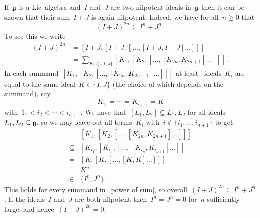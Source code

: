 \begin{remark}
  If~$\mathfrak{g}$ is a Lie~algebra and~$I$ and~$J$ are two nilpotent ideals in~$\mathfrak{g}$ then it can be shown that their sum~$I+J$ is again nilpotent.
  Indeed, we have for all~$n \geq 0$ that
  \[
    (I + J)^{2n}
    \subseteq
    I^n + J^n \,.
  \]
  To see this we write
  \begin{equation}
    \label{power of sum}
    \begin{aligned}
      (I + J)^{2n}
      &=
      [I+J, [I+J, [\dotsc, [I+J, I+J] \dotsc] ] ]
      \\
      &=
      \sum_{K_i \in \{I, J\}}
      [K_1, [K_2, [\dotsc, [K_{2n}, K_{2n+1}] \dotsc] ] ] \,.
    \end{aligned}
  \end{equation}
  In each summand~$[K_1, [K_2, [\dotsc, [K_{2n}, K_{2n+1}] \dotsc] ] ]$ at least~{} ideals~$K_i$ are equal to the same ideal~$K \in \{I, J\}$ (the choice of which depends on the summand), say
  \[
    K_{i_1}
    =
    \dotsb
    =
    K_{i_{n+1}}
    =
    K
  \]
  with~$1_1 < i_2 < \dotsb < i_{n+1}$.
  We have that~$[L_1, L_2] \subseteq L_1, L_2$ for all ideals~$L_1, L_2 \subseteq \mathfrak{g}$, so we may leave out all terms~$K_i$ with~$i \notin \{i_1, \dotsc, i_{n+1}\}$ to get
  \begin{align*}
    {}&
    [K_1, [K_2, [\dotsc, [K_{2n}, K_{2n+1}] \dotsc] ] ]
    \\
    \subseteq{}&
    [K_{i_1}, [K_{i_n}, [\dotsc, [K_{i_n}, K_{i_{n+1}}] \dotsc] ] ]
    \\
    ={}&
    [K, [K, [\dotsc, [K, K] \dotsc] ] ]
    \\
    ={}&
    K^n
    \\
    \in{}&
    \{I^n, J^n\}  \,.
  \end{align*}
  This holds for every summand in~\eqref{power of sum}, so overall~$(I + J)^{2n} \subseteq I^n + J^n$ .
  If the ideals~$I$ and~$J$ are both nilpotent then~$I^n = J^n = 0$ for~$n$ sufficiently large, and hence~$(I + J)^{2n} = 0$.

\end{remark}
